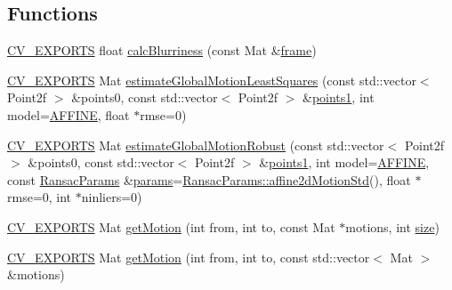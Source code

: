 \subsection*{Functions}
\begin{DoxyCompactItemize}
\item 
\hyperlink{core_2types__c_8h_a1bf9f0e121b54272da02379cfccd0a2b}{C\-V\-\_\-\-E\-X\-P\-O\-R\-T\-S} float \hyperlink{namespacecv_1_1videostab_a5b089ccffc1ca15c6307eb42d00ffd6e}{calc\-Blurriness} (const Mat \&\hyperlink{core__c_8h_a0430deaafd9043e478f306e33961299d}{frame})
\item 
\hyperlink{core_2types__c_8h_a1bf9f0e121b54272da02379cfccd0a2b}{C\-V\-\_\-\-E\-X\-P\-O\-R\-T\-S} Mat \hyperlink{namespacecv_1_1videostab_a2c785630252221715c63352874344d0d}{estimate\-Global\-Motion\-Least\-Squares} (const std\-::vector$<$ Point2f $>$ \&points0, const std\-::vector$<$ Point2f $>$ \&\hyperlink{calib3d_8hpp_a3b72d48e58a35993385885cbc187c91d}{points1}, int model=\hyperlink{namespacecv_1_1videostab_ac61e59db30b7d13983885d3ad3116ce1a3b3ab5020ce40832da2080ca63f4a3fc}{A\-F\-F\-I\-N\-E}, float $\ast$rmse=0)
\item 
\hyperlink{core_2types__c_8h_a1bf9f0e121b54272da02379cfccd0a2b}{C\-V\-\_\-\-E\-X\-P\-O\-R\-T\-S} Mat \hyperlink{namespacecv_1_1videostab_aebf658a7a8e9d1f623ad4b527f47b42f}{estimate\-Global\-Motion\-Robust} (const std\-::vector$<$ Point2f $>$ \&points0, const std\-::vector$<$ Point2f $>$ \&\hyperlink{calib3d_8hpp_a3b72d48e58a35993385885cbc187c91d}{points1}, int model=\hyperlink{namespacecv_1_1videostab_ac61e59db30b7d13983885d3ad3116ce1a3b3ab5020ce40832da2080ca63f4a3fc}{A\-F\-F\-I\-N\-E}, const \hyperlink{structcv_1_1videostab_1_1RansacParams}{Ransac\-Params} \&\hyperlink{compat_8hpp_a0480a03ecc41b20cde376602531d9270}{params}=\hyperlink{structcv_1_1videostab_1_1RansacParams_a373dda5c8cb8882cce9e52bee1827f55}{Ransac\-Params\-::affine2d\-Motion\-Std}(), float $\ast$rmse=0, int $\ast$ninliers=0)
\item 
\hyperlink{core_2types__c_8h_a1bf9f0e121b54272da02379cfccd0a2b}{C\-V\-\_\-\-E\-X\-P\-O\-R\-T\-S} Mat \hyperlink{namespacecv_1_1videostab_aed625f05ee506f2899cbee8cdd64a810}{get\-Motion} (int from, int to, const Mat $\ast$motions, int \hyperlink{legacy_8hpp_ae97003f8d5c64cdfb99f6f2606d121b6}{size})
\item 
\hyperlink{core_2types__c_8h_a1bf9f0e121b54272da02379cfccd0a2b}{C\-V\-\_\-\-E\-X\-P\-O\-R\-T\-S} Mat \hyperlink{namespacecv_1_1videostab_a3c4d339f7e22f330c83af7aebdf720d6}{get\-Motion} (int from, int to, const std\-::vector$<$ Mat $>$ \&motions)

\end{DoxyCompactItemize}
